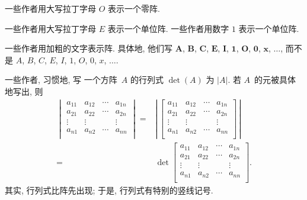 \documentclass[../libro.tex]{subfiles}
\begin{document}
一些作者用大写拉丁字母 \(O\) 表示一个零阵.

一些作者用大写拉丁字母 \(E\) 表示一个单位阵.
一些作者用数字 \(1\) 表示一个单位阵.

一些作者用加粗的文字表示阵.
具体地, 他们写
\(\mathbf{A}\),
\(\mathbf{B}\),
\(\mathbf{C}\),
\(\mathbf{E}\),
\(\mathbf{I}\),
\(\mathbf{1}\),
\(\mathbf{O}\),
\(\mathbf{0}\),
\(\mathbf{x}\),
\(\dots\),
而不是
\(A\), \(B\), \(C\),
\(E\), \(I\), \(1\),
\(O\), \(0\),
\(x\), \(\dots\).

一些作者, 习惯地, 写%
一个方阵~\(A\) 的行列式
\(\det {(A)}\) 为 \(|A|\).
若 \(A\)~的元被具体地写出,
则
\begin{align*}
    \begin{vmatrix}
        a_{11} & a_{12} & \cdots & a_{1n} \\
        a_{21} & a_{22} & \cdots & a_{2n} \\
        \vdots & \vdots & {}     & \vdots \\
        a_{n1} & a_{n2} & \cdots & a_{nn} \\
    \end{vmatrix}
    = {} &
    \left|\,
    \begin{bmatrix}
        a_{11} & a_{12} & \cdots & a_{1n} \\
        a_{21} & a_{22} & \cdots & a_{2n} \\
        \vdots & \vdots & {}     & \vdots \\
        a_{n1} & a_{n2} & \cdots & a_{nn} \\
    \end{bmatrix}
    \,\right|
    \\
    = {} &
    \det {
        \begin{bmatrix}
            a_{11} & a_{12} & \cdots & a_{1n} \\
            a_{21} & a_{22} & \cdots & a_{2n} \\
            \vdots & \vdots & {}     & \vdots \\
            a_{n1} & a_{n2} & \cdots & a_{nn} \\
        \end{bmatrix}
    }.
\end{align*}
其实, 行列式比阵先出现;
于是, 行列式有特别的竖线记号.
\end{document}
